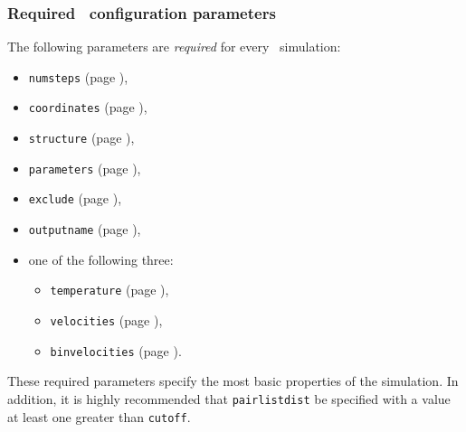 \subsubsection{Required \NAMD\ configuration parameters}
\label{section:requiredparams}

The following parameters are {\em required} for every
\NAMD\ simulation:

\begin{itemize}

\item
{\tt numsteps} (page \pageref{param:numsteps}),

\item
{\tt coordinates} (page \pageref{param:coordinates}),

\item
{\tt structure} (page \pageref{param:structure}),

\item
{\tt parameters} (page \pageref{param:parameters}),

\item
{\tt exclude} (page \pageref{param:exclude}), 

\item
{\tt outputname} (page \pageref{param:outputname}), 

\item
one of the following three:
\begin{itemize}
\item
{\tt temperature} (page \pageref{param:temperature}),

\item
{\tt velocities} (page \pageref{param:velocities}),

\item
{\tt binvelocities} (page \pageref{param:binvelocities}).
\end{itemize}

\end{itemize}

\noindent These required parameters specify the most basic properties of
the simulation.  %
In addition, it is highly recommended that 
{\tt pairlistdist} be specified with a 
value at least one greater than {\tt cutoff}.


